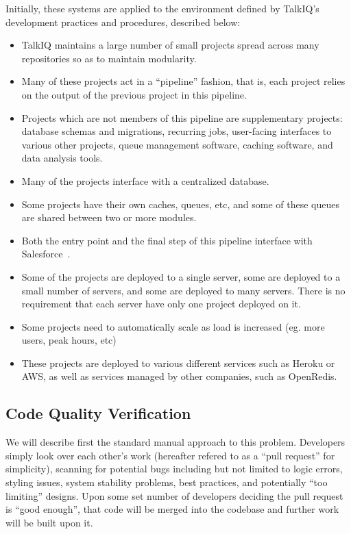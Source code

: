 \documentclass[12pt]{article}
\begin{document}
Initially, these systems are applied to the environment defined by TalkIQ's development practices and procedures, described below:
\begin{itemize}
\item TalkIQ maintains a large number of small projects spread across many repositories so as to maintain modularity.
\item Many of these projects act in a ``pipeline'' fashion, that is, each project relies on the output of the previous project in this pipeline.
\item Projects which are not members of this pipeline are supplementary projects: database schemas and migrations, recurring jobs, user-facing interfaces to various other projects, queue management software, caching software, and data analysis tools.
\item Many of the projects interface with a centralized database.
\item Some projects have their own caches, queues, etc, and some of these queues are shared between two or more modules.
\item Both the entry point and the final step of this pipeline interface with Salesforce~\cite{talkiq}.
\item Some of the projects are deployed to a single server, some are deployed to a small number of servers, and some are deployed to many servers. There is no requirement that each server have only one project deployed on it.
\item Some projects need to automatically scale as load is increased (eg. more users, peak hours, etc)
\item These projects are deployed to various different services such as Heroku or AWS, as well as services managed by other companies, such as OpenRedis.
\end{itemize}

\subsection{Code Quality Verification}
We will describe first the standard manual approach to this problem. Developers simply look over each other's work (hereafter refered to as a ``pull request'' for simplicity), scanning for potential bugs including but not limited to logic errors, styling issues, system stability problems, best practices, and potentially ``too limiting'' designs. Upon some set number of developers deciding the pull request is ``good enough'', that code will be merged into the codebase and further work will be built upon it.
\end{document}
